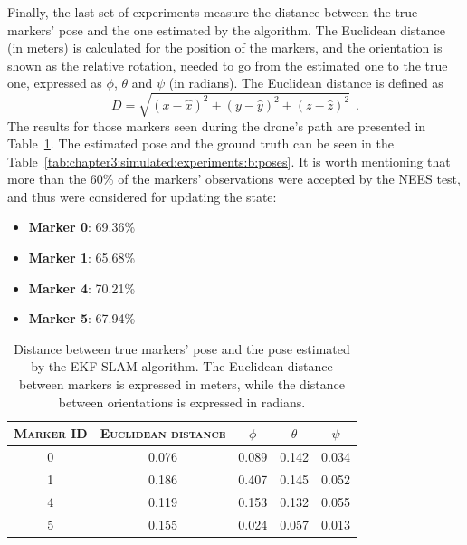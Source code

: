 Finally, the last set of experiments measure the distance between the true markers' pose and the one estimated by the algorithm. The Euclidean distance (in meters) is calculated for the position of the markers, and the orientation is shown as the relative rotation, needed to go from the estimated one to the true one, expressed as $\phi$, $\theta$ and $\psi$ (in radians). The Euclidean distance is defined as\\
\begin{equation*}
    D = \sqrt{(x - \hat{x})^2 + (y - \hat{y})^2 + (z - \hat{z})^2}~~.
\end{equation*}
The results for those markers seen during the drone's path are presented in Table~\ref{tab:chapter3:simulated:experiments:b:distance}. The estimated pose and the ground truth can be seen in the Table~\ref{tab:chapter3:simulated:experiments:b:poses}. It is worth mentioning that more than the 60\% of the markers' observations were accepted by the \ac{NEES} test, and thus were considered for updating the state:
\begin{itemize}
    \item{\textbf{Marker 0}: 69.36\%}
    \item{\textbf{Marker 1}: 65.68\%}
    \item{\textbf{Marker 4}: 70.21\%}
    \item{\textbf{Marker 5}: 67.94\%}
\end{itemize}

\begin{table}
    \centering
    \begin{tabular}{ccccc}
        \toprule
        \textsc{Marker ID} & \textsc{Euclidean distance} & \textsc{$\phi$} & \textsc{$\theta$} & \textsc{$\psi$} \\
        \midrule
        0 & 0.076 & 0.089 & 0.142 & 0.034\\
        1 & 0.186 & 0.407 & 0.145 & 0.052\\
        4 & 0.119 & 0.153 & 0.132 & 0.055\\
        5 & 0.155 & 0.024 & 0.057 & 0.013\\
        \bottomrule
    \end{tabular}
    \caption[Distance to true markers' pose]{Distance between true markers' pose and the pose estimated by the EKF-SLAM algorithm. The Euclidean distance between markers is expressed in meters, while the distance between orientations is expressed in radians.}
    \label{tab:chapter3:simulated:experiments:b:distance}
\end{table}

